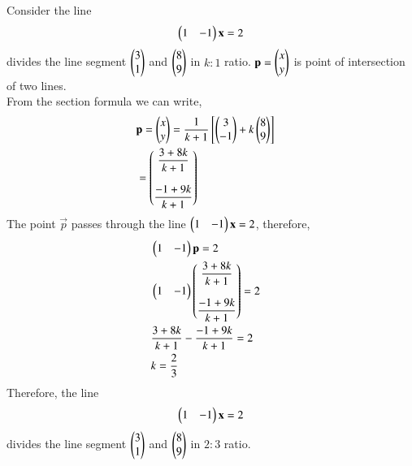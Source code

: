 \documentclass[journal,12pt,twocolumn]{IEEEtran}
\begin{document}
\begin{enumerate}
\solution Consider the line \begin{align} \begin{pmatrix}1&-1\end{pmatrix}\mathbf{x}=2 \end{align} divides the line segment $\begin{pmatrix}3 \\1\end{pmatrix}$ and $\begin{pmatrix}8\\9\end{pmatrix} $ in $k:1$ ratio.
$\mathbf{p}=\begin{pmatrix}x \\ y\end{pmatrix} $ is point of intersection of two lines.\\ 
From the section formula we can write,
\begin{align}
&\mathbf{p} = \begin{pmatrix}x\\ y\end{pmatrix} = \displaystyle\frac{1}{k+1}\left[\begin{pmatrix}3\\-1\end{pmatrix}+ k\begin{pmatrix}8\\9\end{pmatrix}\right]&\\
 &= \begin{pmatrix}\displaystyle\frac{3+8k}{k+1} \\\\ \displaystyle\frac{-1+9k}{k+1}\end{pmatrix}&
\end{align}
The point $\vec{p}$ passes through the line $\begin{pmatrix}1&-1\end{pmatrix}\mathbf{x}=2$, therefore,
\begin{align}
&\myvec{1&-1}\vec{p}=2&\\
&\myvec{1&-1}\myvec{\displaystyle\frac{3+8k}{k+1} \\\\ \displaystyle\frac{-1+9k}{k+1}}=2&\\
\medskip
&\displaystyle\frac{3+8k}{k+1} - \displaystyle\frac{-1+9k}{k+1}  = 2&\\
&k=\displaystyle\frac{2}{3}&
\end{align}
Therefore, the line \begin{align} \begin{pmatrix}1&-1\end{pmatrix}\mathbf{x}=2 \end{align} divides the line segment $\begin{pmatrix}3 \\1\end{pmatrix}$ and $\begin{pmatrix}8\\9\end{pmatrix} $ in $2:3$ ratio.
\end{enumerate}
\end{document}
